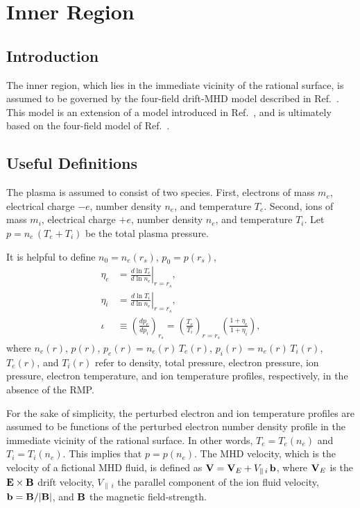 \documentclass[12pt,prb,aps]{revtex4-1}
\begin{document}
\section{Inner Region}\label{inner}
\subsection{Introduction}
The inner region, which lies in the immediate vicinity of the rational surface, is assumed to be governed by the  four-field drift-MHD model described in Ref.~. This
model is an extension of a model introduced in Ref.~, and is ultimately based on the four-field model of Ref.~. 

\subsection{Useful Definitions}
The plasma is assumed to consist of two species. First, electrons of mass $m_e$, electrical charge $-e$, 
number density $n_e$, and temperature $T_e$.  Second, ions of mass $m_i$, electrical charge $+e$,  
number density $n_e$, and temperature $T_i$. Let $p=n_e\,(T_e+T_i)$ be the total plasma pressure. 

It is helpful to define $n_0 = n_e(r_s)$, $p_0= p(r_s)$,
\begin{align}
\eta_e &=\left.\frac{d\ln T_e}{d\ln n_e}\right|_{r=r_s},\label{e211}\\[0.5ex]
\eta_i &= \left.\frac{d\ln T_i}{d\ln n_e}\right|_{r=r_s},\\[0.5ex]
\iota &\equiv \left(\frac{dp_e}{dp_i}\right)_{r_s}= \left(\frac{T_e}{T_i}\right)_{r=r_s}\left(\frac{1+\eta_e}{1+\eta_i}\right),\label{e213}
\end{align}
where $n_e(r)$, $p(r)$, $p_e(r)= n_e(r)\,T_e(r)$, $p_i(r)= n_e(r)\,T_i(r)$, $T_e(r)$, and $T_i(r)$ refer to
density, total pressure, electron pressure, ion pressure,  electron temperature, and ion temperature profiles, respectively, in the absence of the RMP. 

For the sake of simplicity, the perturbed electron and ion temperature profiles are assumed to be functions of
the perturbed electron number density profile in the immediate vicinity of the rational surface. In other words, $T_e=T_e(n_e)$ and $T_i=T_i(n_e)$. This
implies that $p=p(n_e)$. 
The  MHD velocity, which is the velocity of a
fictional MHD fluid,\cite{haz1} is defined as ${\bf V}={\bf V}_E + V_{\parallel\,i}\,{\bf b}$, where ${\bf V}_E$ is the
${\bf E}\times {\bf B}$ drift velocity, $V_{\parallel\,i}$  the parallel component of the ion fluid
velocity, ${\bf b}= {\bf B}/|{\bf B}|$, and ${\bf B}$ the magnetic field-strength. 
\end{document}
